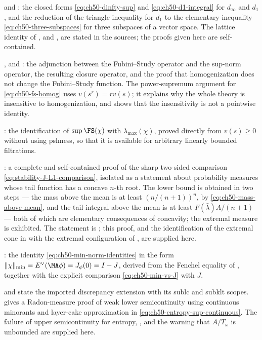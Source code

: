  and : the closed
forms \eqref{eq:ch50-dinfty-sup} and \eqref{eq:ch50-d1-integral} for
$d_\infty$ and $d_1$, and the reduction of the triangle inequality for
$d_1$ to the elementary inequality \eqref{eq:ch50-three-subspaces} for
three subspaces of a vector space.  The lattice identity of
, and , are stated in the
sources; the proofs given here are self-contained.

,  and
: the adjunction between the Fubini--Study
operator and the sup-norm operator, the resulting closure operator, and the
proof that homogenization does not change the Fubini--Study function.  The
power-supremum argument for \eqref{eq:ch50-fs-homog} uses
$v(s^r)=rv(s)$; it explains why the whole theory is
insensitive to homogenization, and  shows that
the insensitivity is not a pointwise identity.

: the identification of
$\sup\FS(\chi)$ with $\lambda_{\max}(\chi)$, proved directly from
$v(s)\ge0$ without using pshness, so that it is available for arbitrary
linearly bounded filtrations.

: a complete and self-contained proof of the sharp
two-sided comparison \eqref{eq:stability-J-L1-comparison}, isolated as a
statement about probability measures whose tail function has a concave
$n$-th root.  The lower bound is obtained in two steps --- the mass above
the mean is at least $(n/(n+1))^n$, by
\eqref{eq:ch50-mass-above-mean}, and the tail integral above the mean is at
least $F(\bar\lambda)A/(n+1)$ --- both of which are elementary
consequences of concavity; the extremal measure is exhibited.  The
statement is \cite[Theorem~7.9]{BHJ17}; this proof, and the identification
of the extremal cone in  with the extremal
configuration of , are supplied here.

: the identity
\eqref{eq:ch50-min-norm-identities} in the form
$\|\chi\|_{\min}=E^\vee(\MA\phi)=J_\phi(0)=I-J$, derived from the Fenchel
equality of , together with the explicit
comparison \eqref{eq:ch50-min-vs-J} with $J$.

 and 
state the imported discrepancy extension with its sublc and subklt
scopes.   gives a Radon-measure proof of
weak lower semicontinuity using continuous minorants and layer-cake
approximation in \eqref{eq:ch50-entropy-sup-continuous}.  The
failure of upper semicontinuity for entropy,
, and the
warning  that $A/T_\omega$ is unbounded are
supplied here.

